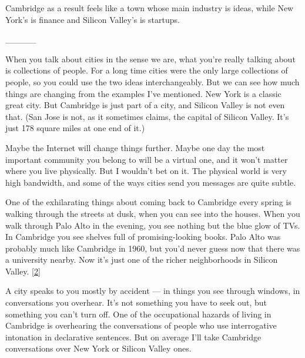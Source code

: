 Cambridge as a result feels like a town whose
                  main industry is ideas, while New York's is finance and
                  Silicon Valley's is startups.


                  \_\_\_\_\_
                  

When you talk about cities in the sense we are,
                  what you're really talking about is collections of people. For
                  a long time cities were the only large collections of people,
                  so you could use the two ideas interchangeably. But we can see
                  how much things are changing from the examples I've mentioned.
                  New York is a classic great city. But Cambridge is just part
                  of a city, and Silicon Valley is not even that. (San Jose is
                  not, as it sometimes claims, the capital of Silicon Valley.
                  It's just 178 square miles at one end of it.)

Maybe
                  the Internet will change things further. Maybe one day the
                  most important community you belong to will be a virtual one,
                  and it won't matter where you live physically. But I wouldn't
                  bet on it. The physical world is very high bandwidth, and some
                  of the ways cities send you messages are quite subtle.

One
                  of the exhilarating things about coming back to Cambridge
                  every spring is walking through the streets at dusk, when you
                  can see into the houses. When you walk through Palo Alto in
                  the evening, you see nothing but the blue glow of TVs. In
                  Cambridge you see shelves full of promising-looking books.
                  Palo Alto was probably much like Cambridge in 1960, but you'd
                  never guess now that there was a university nearby. Now it's
                  just one of the richer neighborhoods in Silicon Valley.
                  [\href{\#f2n}{2}]

A city speaks to you mostly by accident ---
                  in things you see through windows, in conversations you
                  overhear. It's not something you have to seek out, but
                  something you can't turn off. One of the occupational hazards
                  of living in Cambridge is overhearing the conversations of
                  people who use interrogative intonation in declarative
                  sentences. But on average I'll take Cambridge conversations
                  over New York or Silicon Valley ones.

